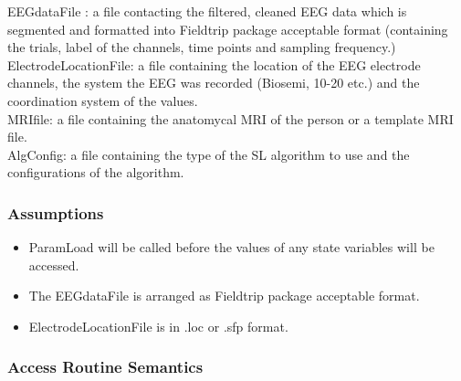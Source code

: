 \documentclass[12pt, titlepage]{article}
\begin{document}
EEGdataFile : a file contacting the filtered, cleaned EEG data which is segmented and formatted into Fieldtrip package acceptable format (containing the trials, label of the channels, time points and sampling frequency.)\\

ElectrodeLocationFile: a file containing the location of the EEG electrode channels, the system the EEG was recorded (Biosemi, 10-20 etc.) and the coordination system of the values.\\

MRIfile: a file containing the anatomycal MRI of the person or a template MRI file.\\

AlgConfig: a file containing the type of the SL algorithm to use and the configurations of the algorithm.\\



\subsubsection{Assumptions}
\begin{itemize}	
	\item ParamLoad will be called before the values of any state variables will be accessed.
	\item The EEGdataFile is arranged as Fieldtrip package acceptable format.
	\item ElectrodeLocationFile is in .loc or .sfp format.
\end{itemize}
	

\subsubsection{Access Routine Semantics}
\end{document}
